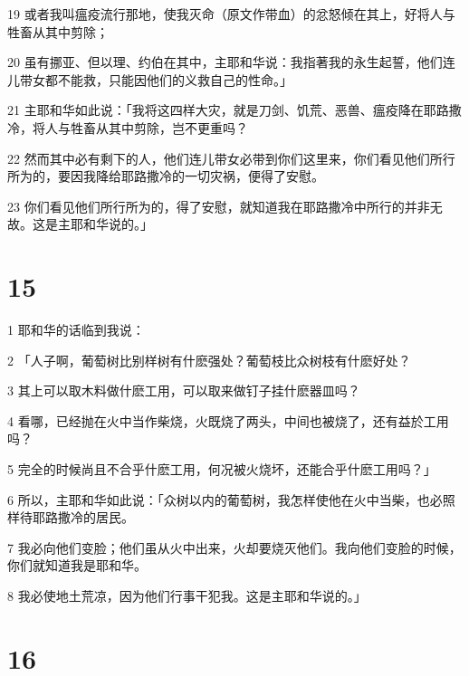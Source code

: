 \par 19 或者我叫瘟疫流行那地，使我灭命（原文作带血）的忿怒倾在其上，好将人与牲畜从其中剪除；
\par 20 虽有挪亚、但以理、约伯在其中，主耶和华说：我指著我的永生起誓，他们连儿带女都不能救，只能因他们的义救自己的性命。」
\par 21 主耶和华如此说：「我将这四样大灾，就是刀剑、饥荒、恶兽、瘟疫降在耶路撒冷，将人与牲畜从其中剪除，岂不更重吗？
\par 22 然而其中必有剩下的人，他们连儿带女必带到你们这里来，你们看见他们所行所为的，要因我降给耶路撒冷的一切灾祸，便得了安慰。
\par 23 你们看见他们所行所为的，得了安慰，就知道我在耶路撒冷中所行的并非无故。这是主耶和华说的。」

\chapter{15}

\par 1 耶和华的话临到我说：
\par 2 「人子啊，葡萄树比别样树有什麽强处？葡萄枝比众树枝有什麽好处？
\par 3 其上可以取木料做什麽工用，可以取来做钉子挂什麽器皿吗？
\par 4 看哪，已经抛在火中当作柴烧，火既烧了两头，中间也被烧了，还有益於工用吗？
\par 5 完全的时候尚且不合乎什麽工用，何况被火烧坏，还能合乎什麽工用吗？」
\par 6 所以，主耶和华如此说：「众树以内的葡萄树，我怎样使他在火中当柴，也必照样待耶路撒冷的居民。
\par 7 我必向他们变脸；他们虽从火中出来，火却要烧灭他们。我向他们变脸的时候，你们就知道我是耶和华。
\par 8 我必使地土荒凉，因为他们行事干犯我。这是主耶和华说的。」

\chapter{16}


